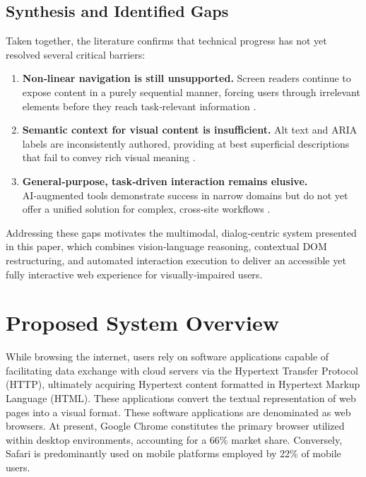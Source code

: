 \documentclass[conference]{IEEEtran}
\begin{document}
\subsection*{Synthesis and Identified Gaps}

Taken together, the literature confirms that technical progress has not yet resolved several critical barriers:

\begin{enumerate}
\item \textbf{Non‑linear navigation is still unsupported.} Screen readers continue to expose content in a purely sequential manner, forcing users through irrelevant elements before they reach task‑relevant information \cite{kerdar2024,wcagchallenges2025}.  
\item \textbf{Semantic context for visual content is insufficient.} Alt text and ARIA labels are inconsistently authored, providing at best superficial descriptions that fail to convey rich visual meaning \cite{wcag2023,wcagchallenges2025}.  
\item \textbf{General‑purpose, task‑driven interaction remains elusive.} AI‑augmented tools demonstrate success in narrow domains but do not yet offer a unified solution for complex, cross‑site workflows \cite{prakash2024,kodandaram2024,mehendale2024}.  
\end{enumerate}

Addressing these gaps motivates the multimodal, dialog‑centric system presented in this paper, which combines vision‑language reasoning, contextual DOM restructuring, and automated interaction execution to deliver an accessible yet fully interactive web experience for visually‑impaired users.



\section{Proposed System Overview}

While browsing the internet, users rely on software applications capable of facilitating data exchange with cloud servers via the Hypertext Transfer Protocol (HTTP), ultimately acquiring Hypertext content formatted in Hypertext Markup Language (HTML). These applications convert the textual representation of web pages into a visual format. These software applications are denominated as web browsers. At present, Google Chrome constitutes the primary browser utilized within desktop environments, accounting for a 66\% \cite{browserstats2025} market share. Conversely, Safari is predominantly used on mobile platforms employed by 22\% \cite{browserstats2025} of mobile users.
\end{document}
